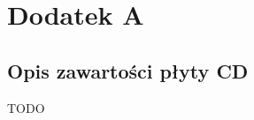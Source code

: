 \documentclass[licencjacka]{pracamgr}
\begin{document}
\chapter*{Dodatek A} \label{chap:dodatki}
\section*{Opis zawartości płyty CD}
TODO
\end{document}
